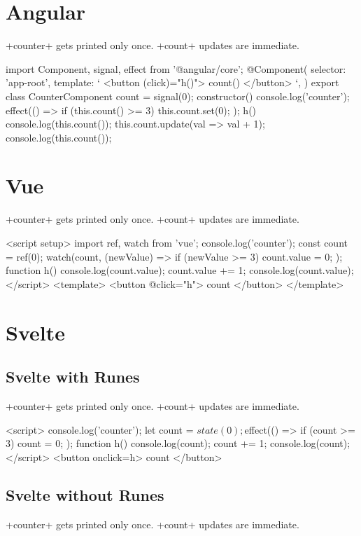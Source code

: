 \section{Angular}
+counter+ gets printed only once.
+count+ updates are immediate.
\begin{reactcode}
import {Component, signal, effect} from '@angular/core';
@Component({
  selector: 'app-root',
  template: `
    <button (click)="h()">
      {{ count() }}
    </button>
  `,
})
export class CounterComponent {
  count = signal(0);
  constructor() {
    console.log('counter');
    effect(() => {
      if (this.count() >= 3) {
        this.count.set(0);
      }
    });
  }
  h() {
    console.log(this.count());
    this.count.update(val => val + 1);
    console.log(this.count());
  }
}
\end{reactcode}


\section{Vue}
+counter+ gets printed only once.
+count+ updates are immediate.
\begin{reactcode}
<script setup>
import { ref, watch } from 'vue';
console.log('counter');
const count = ref(0);
watch(count, (newValue) => {
  if (newValue >= 3) {
    count.value = 0;
  }
});
function h() {
  console.log(count.value);
  count.value += 1;
  console.log(count.value);
}
</script>
<template>
  <button @click="h">
    {{ count }}
  </button>
</template>
\end{reactcode}


\section{Svelte}
\subsection{Svelte with Runes}
+counter+ gets printed only once.
+count+ updates are immediate.
\begin{reactcode}
<script>
  console.log('counter');
  let count = $state(0);
  $effect(() => {
    if (count >= 3) {
      count = 0;
    }
  });
  function h() {
    console.log(count);
    count += 1;
    console.log(count);
  }
</script>
<button onclick={h}>
  {count}
</button>
\end{reactcode}

\subsection{Svelte without Runes}
+counter+ gets printed only once.
+count+ updates are immediate.


